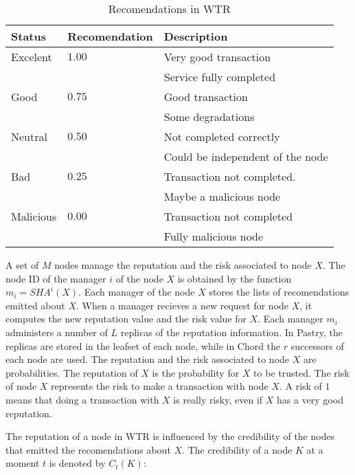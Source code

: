   \begin{table}
    \centering
    \footnotesize
    \begin{tabular}{|l|l|l|}
      \hline
      \textbf{Status} & \textbf{Recomendation} & \textbf{Description}\\
      \hline
      Excelent  & $1.00$    & Very good transaction\\
                &           & Service fully completed\\
      Good      & $0.75$    & Good transaction\\
                &           & Some degradations\\
      Neutral   & $0.50$     & Not completed correctly\\
                &           & Could be independent of the node\\
      Bad       & $0.25$    & Transaction not completed.\\
                &           & Maybe a malicious node\\
      Malicious & $0.00$    & Transaction not completed\\
                &           & Fully malicious node\\
      \hline
    \end{tabular}
    \caption{Recomendations in WTR}
    \label{table:wtr_recomendations}
  \end{table}

A set of $M$ nodes manage the reputation and the risk associated to node $X$.
The node ID of the manager $i$ of the node $X$ is
obtained by the function $m_i = SHA^{i}(X)$. Each manager of the node $X$
stores the lists of recomendations emitted about $X$. When a manager recieves a
new request for node $X$, it computes the new reputation value and the risk
value for $X$.
Each manager $m_i$ administers a number of $L$ replicas of the reputation information. In Pastry,
the replicas are stored in the leafset of each node, while in Chord the $r$
successors of each node are used.
The reputation and the risk associated to node $X$ are probabilities. The
reputation of $X$ is the probability for $X$ to be trusted. The risk of node
$X$ represents the risk to make a transaction with node $X$. A risk of $1$
means that doing a transaction with $X$ is really risky, even if $X$ has a very
good reputation.

The reputation of a node in WTR is influenced by the credibility of the nodes
that emitted the recomendations about $X$. The credibility of a node $K$ at a
moment $t$ is denoted by $C_t (K)$:%

